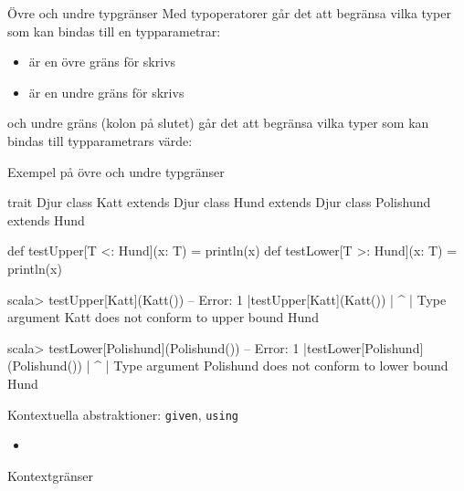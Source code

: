 



\begin{Slide}{Övre och undre typgränser}
Med typoperatorer går det att begränsa vilka typer som kan bindas till en typparametrar:
\begin{itemize}
  \item {} är en övre gräns  för  skrivs  
  \item {} är en undre gräns  för  skrivs  
\end{itemize} 
och undre gräns \code{>:} (kolon på slutet) går det att begränsa vilka typer som kan bindas till typparametrars värde:
\end{Slide}

\begin{Slide}{Exempel på övre och undre typgränser}

\begin{Code}
trait Djur
class Katt extends Djur 
class Hund extends Djur
class Polishund extends Hund

def testUpper[T <: Hund](x: T) = println(x)
def testLower[T >: Hund](x: T) = println(x)
\end{Code}

\begin{REPL}
scala> testUpper[Katt](Katt())
-- Error:
1 |testUpper[Katt](Katt())
  |          ^
  |          Type argument Katt does not conform to upper bound Hund

scala> testLower[Polishund](Polishund())
-- Error:
1 |testLower[Polishund](Polishund())
  |          ^
  |          Type argument Polishund does not conform to lower bound Hund
\end{REPL}

\end{Slide}


 
\begin{Slide}{Kontextuella abstraktioner: \texttt{given}, \texttt{using}}\SlideFontSmall
\begin{itemize}\SlideFontTiny
\item \TODO {} 
\end{itemize}
\end{Slide}

\begin{Slide}{Kontextgränser}
\TODO {}
\end{Slide}






